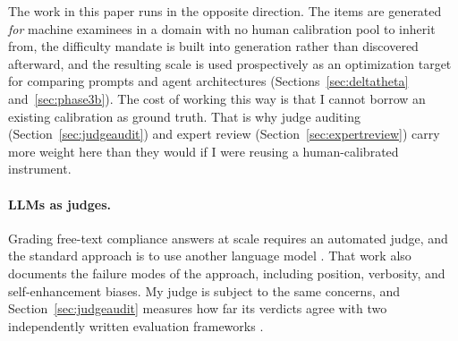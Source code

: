 The work in this paper runs in the opposite direction. The items are
generated \emph{for} machine examinees in a domain with no human
calibration pool to inherit from, the difficulty mandate is built into
generation rather than discovered afterward, and the resulting scale is
used prospectively as an optimization target for comparing prompts and
agent architectures (Sections~\ref{sec:deltatheta}
and~\ref{sec:phase3b}). The cost of working this way is that I cannot
borrow an existing calibration as ground truth. That is why judge
auditing (Section~\ref{sec:judgeaudit}) and expert review
(Section~\ref{sec:expertreview}) carry more weight here than they would
if I were reusing a human-calibrated instrument.

\paragraph{LLMs as judges.}
Grading free-text compliance answers at scale requires an automated
judge, and the standard approach is to use another language model
\citep{zheng2023judge}. That work also documents the failure modes of the
approach, including position, verbosity, and self-enhancement biases. My
judge is subject to the same concerns, and Section~\ref{sec:judgeaudit}
measures how far its verdicts agree with two independently written
evaluation frameworks \citep{liu2023geval,es2024ragas}.
